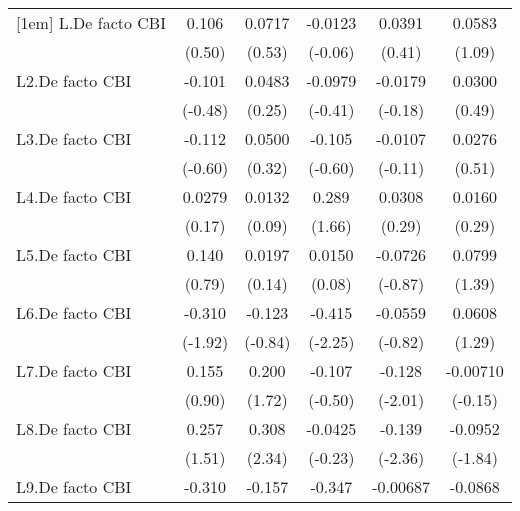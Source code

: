 {\begin{longtable}{l*{5}{c}}
[1em]
L.De facto CBI  &    0.106         &   0.0717         &  -0.0123         &   0.0391         &   0.0583         \\
                &   (0.50)         &   (0.53)         &  (-0.06)         &   (0.41)         &   (1.09)         \\
[1em]
L2.De facto CBI &   -0.101         &   0.0483         &  -0.0979         &  -0.0179         &   0.0300         \\
                &  (-0.48)         &   (0.25)         &  (-0.41)         &  (-0.18)         &   (0.49)         \\
[1em]
L3.De facto CBI &   -0.112         &   0.0500         &   -0.105         &  -0.0107         &   0.0276         \\
                &  (-0.60)         &   (0.32)         &  (-0.60)         &  (-0.11)         &   (0.51)         \\
[1em]
L4.De facto CBI &   0.0279         &   0.0132         &    0.289         &   0.0308         &   0.0160         \\
                &   (0.17)         &   (0.09)         &   (1.66)         &   (0.29)         &   (0.29)         \\
[1em]
L5.De facto CBI &    0.140         &   0.0197         &   0.0150         &  -0.0726         &   0.0799         \\
                &   (0.79)         &   (0.14)         &   (0.08)         &  (-0.87)         &   (1.39)         \\
[1em]
L6.De facto CBI &   -0.310         &   -0.123         &   -0.415\sym{*}  &  -0.0559         &   0.0608         \\
                &  (-1.92)         &  (-0.84)         &  (-2.25)         &  (-0.82)         &   (1.29)         \\
[1em]
L7.De facto CBI &    0.155         &    0.200         &   -0.107         &   -0.128\sym{*}  & -0.00710         \\
                &   (0.90)         &   (1.72)         &  (-0.50)         &  (-2.01)         &  (-0.15)         \\
[1em]
L8.De facto CBI &    0.257         &    0.308\sym{*}  &  -0.0425         &   -0.139\sym{*}  &  -0.0952         \\
                &   (1.51)         &   (2.34)         &  (-0.23)         &  (-2.36)         &  (-1.84)         \\
[1em]
L9.De facto CBI &   -0.310         &   -0.157         &   -0.347\sym{*}  & -0.00687         &  -0.0868         \\

\end{longtable}}
